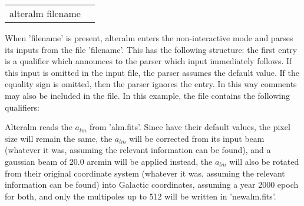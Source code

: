 \begin{examples}{2}
{
\begin{tabular}{ll} %
alteralm  filename \\
\end{tabular}
}
{When 'filename' is present, alteralm enters the non-interactive mode and parses
its inputs from the file 'filename'. This has the following
structure: the first entry is a qualifier which announces to the parser
which input immediately follows. If this input is omitted in the
input file, the parser assumes the default value.
If the equality sign is omitted, then the parser ignores the entry.
In this way comments may also be included in the file.
In this example, the file contains the following qualifiers:\hfill\newline
{}

Alteralm reads the $a_{lm}$ from 'alm.fits'. Since \hfill\newline
{}
have their default values, the pixel size will remain the same, the $a_{lm}$ will be corrected
from its input beam (whatever it was, assuming the relevant information can be
found), and a gaussian beam of 20.0 arcmin will be applied
instead, the $a_{lm}$ will also be rotated from their original coordinate system
(whatever it was, assuming the relevant information can be found)
into Galactic coordinates, assuming a year 2000 epoch for both,
 and only the multipoles up to 512 will be written in
'newalm.fits'.
}
\end{examples}

